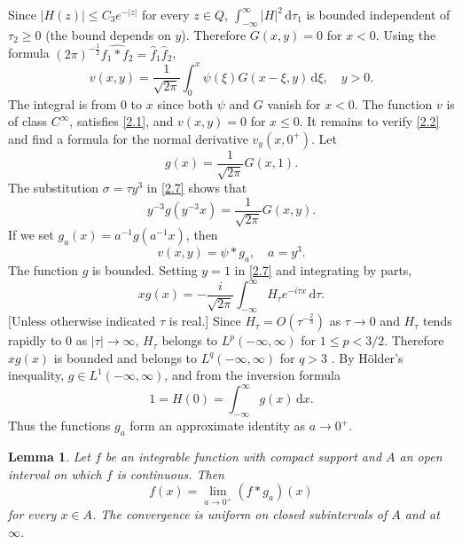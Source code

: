 \documentclass[leqno]{article}
\numberwithin{equation}{section}
\theoremstyle{plain}
\newtheorem*{lemma*}{Lemma}
\newcommand{\dd}{\,\mathrm{d}}
\begin{document}
Since $|H(z)| \leq C_3 e^{-|z|}$ for every $z \in Q$, $\int_{-\infty}^{\infty}|H|^2 \dd \tau_1$ is bounded independent of $\tau_2 \geq 0$ (the bound depends on $y$).
Therefore \cite[p.\ 8]{PW} $G(x,y) = 0$ for $x < 0$.
Using the formula $(2\pi)^{-\frac 12} \widehat{f_1 * f_2} = \hat{f}_1 \hat{f}_2$,
\begin{equation}
	\label{2.8}
	v(x,y) = \frac{1}{\sqrt{2\pi}} \int_0^x \psi(\xi) G(x-\xi,y) \dd \xi,
	\quad y > 0.
\end{equation}
The integral is from $0$ to $x$ since both $\psi$ and $G$ vanish for $x < 0$.
The function $v$ is of class $C^\infty$, satisfies \eqref{2.1}, and $v(x,y) = 0$ for $x \leq 0$.
It remains to verify \eqref{2.2} and find a formula for the normal derivative $v_y(x,0^+)$.
Let
\begin{equation}
	\label{2.9}
	g(x) = \frac{1}{\sqrt{2\pi}} G(x,1).
\end{equation}
The substitution $\sigma = \tau y^3$ in \eqref{2.7} shows that
\begin{equation*}
	y^{-3} g(y^{-3}x) = \frac{1}{\sqrt{2\pi}} G(x,y).
\end{equation*}
If we set $g_a(x) = a^{-1} g(a^{-1}x)$, then
\begin{equation}
	\label{2.8'}
	\tag{2.8'}
	v(x,y) = \psi * g_a,
	\quad 
	a = y^3.
\end{equation}
The function $g$ is bounded.
Setting $y = 1$ in \eqref{2.7} and integrating by parts,
\begin{equation*}
	x g(x) = - \frac{i}{\sqrt{2\pi}} \int_{-\infty}^{\infty} H_\tau e^{-i\tau x} \dd \tau.
\end{equation*}
[Unless otherwise indicated $\tau$ is real.]
Since $H_\tau = O(\tau^{-\frac 23})$ as $\tau \to 0$ and $H_\tau$ tends rapidly to $0$ as $|\tau|\to \infty$, $H_\tau$ belongs to $L^p(-\infty,\infty)$ for $1\leq p<3/2$.
Therefore $xg(x)$ is bounded and belongs to $L^q(-\infty,\infty)$ for $q>3$ \cite[12.41]{Z}.
By Hölder's inequality, $g \in L^1(-\infty,\infty)$, and from the inversion formula
\begin{equation*}
	1 = H(0) = \int_{-\infty}^{\infty} g(x) \dd x.
\end{equation*}
Thus the functions $g_a$ form an approximate identity as $a \to 0^+$.

\begin{lemma*}
	Let $f$ be an integrable function with compact support and $A$ an open interval on which $f$ is continuous. 
	Then
	\begin{equation*}
		f(x) = \lim_{a \to 0^+} (f * g_a)(x)
	\end{equation*}
	for every $x \in A$.
	The convergence is uniform on closed subintervals of $A$ and at~$\infty$.
\end{lemma*}
\end{document}
